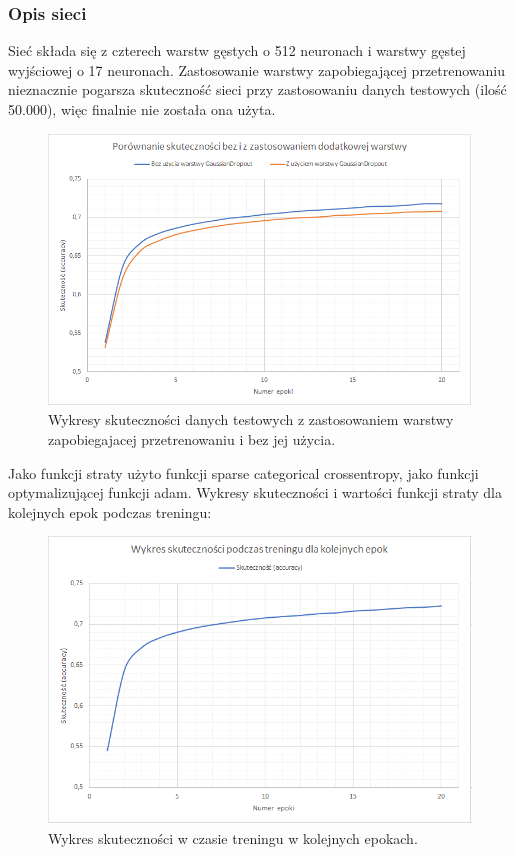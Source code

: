 \documentclass[letterpaper,12pt]{article}
\begin{document}
\subsubsection*{Opis sieci}
Sieć składa się z czterech warstw gęstych o 512 neuronach i warstwy gęstej wyjściowej o 17 neuronach. Zastosowanie warstwy zapobiegającej przetrenowaniu nieznacznie pogarsza skuteczność sieci przy zastosowaniu danych testowych (ilość 50.000), 
więc finalnie nie została ona użyta. 
\begin{figure}[H]
    \centering
    \includegraphics[scale=0.85]{gaussian.png}
    \caption{Wykresy skuteczności danych testowych z zastosowaniem warstwy zapobiegajacej przetrenowaniu i bez jej użycia.}
\end{figure} 
Jako funkcji straty użyto funkcji sparse categorical crossentropy, jako funkcji optymalizującej funkcji adam. Wykresy skuteczności i wartości funkcji straty dla kolejnych epok podczas treningu:
\begin{figure}[H]
    \centering
    \includegraphics[scale=0.6]{skutecznosc.png}
    \caption{Wykres skuteczności w czasie treningu w kolejnych epokach.}
\end{figure} 
\end{document}
